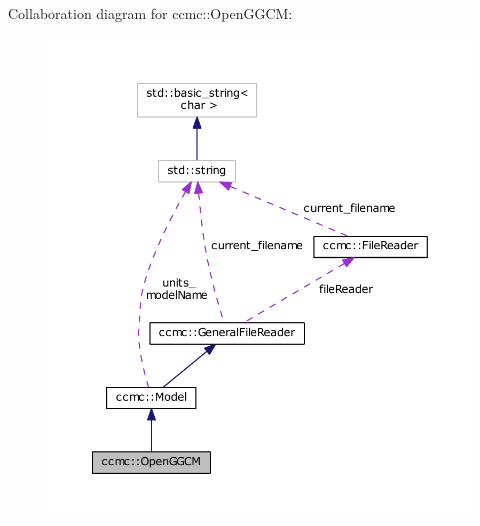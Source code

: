 Collaboration diagram for ccmc\-:\-:Open\-G\-G\-C\-M\-:\nopagebreak
\begin{figure}[H]
\begin{center}
\leavevmode
\includegraphics[width=350pt]{classccmc_1_1_open_g_g_c_m__coll__graph}
\end{center}
\end{figure}
